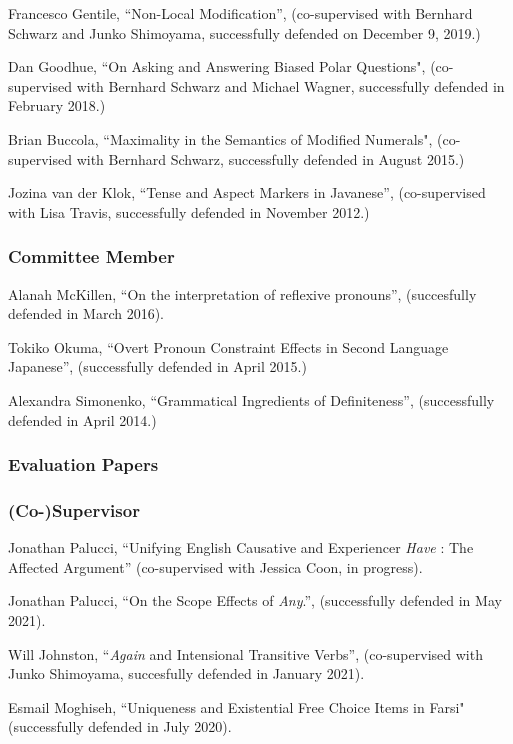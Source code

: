 \documentclass[11pt]{article}
\begin{document}
Francesco Gentile, ``Non-Local Modification'', (co-supervised with Bernhard Schwarz and Junko Shimoyama, successfully defended on December 9, 2019.)

Dan Goodhue, ``On Asking and Answering Biased Polar Questions", (co-supervised with Bernhard Schwarz and Michael Wagner, successfully defended in February 2018.)

Brian Buccola, ``Maximality in the Semantics of Modified Numerals", (co-supervised with Bernhard Schwarz, successfully defended in August 2015.)

Jozina van der Klok, ``Tense and Aspect Markers in Javanese'',
(co-supervised with Lisa Travis, successfully defended in November
2012.)

\vspace{-10pt}

\subsubsection*{Committee Member}

Alanah McKillen, ``On the interpretation of reflexive pronouns'', (succesfully defended in March 2016).

Tokiko Okuma, ``Overt Pronoun Constraint Effects in Second Language Japanese'', (successfully defended in April 2015.)

Alexandra Simonenko, ``Grammatical Ingredients of Definiteness'',
(successfully defended in April 2014.)
\vspace{-10pt}


\subsubsection*{Evaluation Papers}

\subsubsection*{(Co-)Supervisor}

Jonathan Palucci, ``Unifying English Causative and Experiencer \textit{Have} : The Affected Argument'' (co-supervised with Jessica Coon, in progress).

Jonathan Palucci, ``On the Scope Effects of \textit{Any}.'', (successfully defended in May 2021).

Will Johnston, ``\textit{Again} and Intensional Transitive Verbs'', (co-supervised with Junko Shimoyama, succesfully defended in January 2021).

Esmail Moghiseh, ``Uniqueness and Existential Free Choice Items in Farsi" (successfully defended in July 2020).
\end{document}
